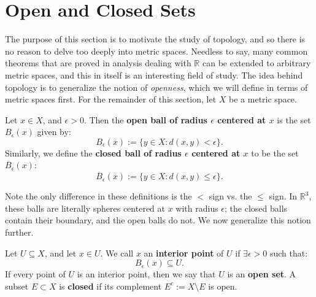 \newpage
\section{Open and Closed Sets}
	
	The purpose of this section is to motivate the study of topology, and so there is no reason to delve too deeply into metric spaces. Needless to say, many 
	common theorems that are proved in analysis dealing with $\mathbb R$ can be extended to arbitrary metric spaces, and this in itself is an interesting field 
	of study. The idea behind topology is to generalize the notion of \textit{openness}, which we will define in terms of metric spaces first. For the remainder 
	of this section, let $X$ be a metric space.
	
	\begin{definition}
	Let $x\in X$, and $\epsilon > 0$. Then the \textbf{open ball of radius $\epsilon$ centered at $x$} is the set $B_\epsilon(x)$ given by:
	\begin{equation}
		B_\epsilon(x) := \{y\in X : d(x, y) < \epsilon\}.
	\end{equation}
	Similarly, we define the \textbf{closed ball of radius $\epsilon$ centered at $x$} to be the set $\overline B_\epsilon(x)$:
	\begin{equation}
		\overline B_\epsilon(x) := \{y\in X : d(x, y)\leq\epsilon\}.
	\end{equation}
	\end{definition}
	
	Note the only difference in these definitions is the $<$ sign vs. the $\leq$ sign. In $\mathbb R^3$, these balls are literally spheres centered at $x$ with radius 
	$\epsilon$; the closed balls contain their boundary, and the open balls do not. We now generalize this notion further.
	
	\begin{definition}
	Let $U\subseteq X$, and let $x\in U$. We call $x$ an \textbf{interior point} of $U$ if $\exists\epsilon > 0$ such that:
	\begin{equation}
		B_\epsilon(x)\subseteq U.
	\end{equation}
	If every point of $U$ is an interior point, then we say that $U$ is an \textbf{open set}.
	\newline\newline
	A subset $E\subset X$ is \textbf{closed} if its complement $E^c := X\setminus E$ is open.
	\end{definition}


